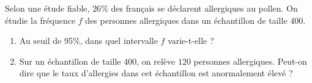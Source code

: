 
\begin{exercice}\label{exosmath-0329}

    Selon une étude fiable, \( 26\%\) des français se déclarent allergiques au pollen. On étudie la fréquence $f$ des personnes allergiques dans un échantillon de taille $400$.
    \begin{enumerate}
        \item
 Au seuil de 95\%, dans quel intervalle $f$ varie-t-elle ?
 \item
Sur un échantillon de taille $400$, on relève $120$ personnes allergiques. Peut-on dire que le taux d’allergies dans cet échantillon est anormalement élevé ?
    \end{enumerate}

\end{exercice}
